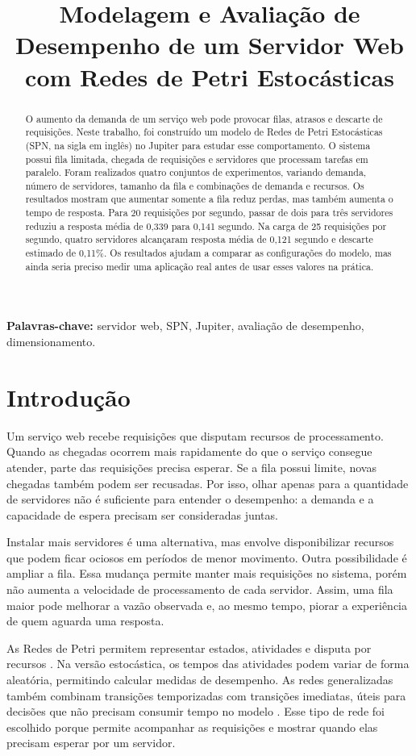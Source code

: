 \documentclass[10pt]{ieeeconf}
\title{Modelagem e Avaliação de Desempenho de um Servidor Web com Redes de Petri Estocásticas}
\begin{document}
\maketitle
\begin{abstract}
O aumento da demanda de um serviço web pode provocar filas, atrasos e descarte de requisições. Neste trabalho, foi construído um modelo de Redes de Petri Estocásticas (SPN, na sigla em inglês) no Jupiter para estudar esse comportamento. O sistema possui fila limitada, chegada de requisições e servidores que processam tarefas em paralelo. Foram realizados quatro conjuntos de experimentos, variando demanda, número de servidores, tamanho da fila e combinações de demanda e recursos. Os resultados mostram que aumentar somente a fila reduz perdas, mas também aumenta o tempo de resposta. Para 20 requisições por segundo, passar de dois para três servidores reduziu a resposta média de 0,339 para 0,141 segundo. Na carga de 25 requisições por segundo, quatro servidores alcançaram resposta média de 0,121 segundo e descarte estimado de 0,11\%. Os resultados ajudam a comparar as configurações do modelo, mas ainda seria preciso medir uma aplicação real antes de usar esses valores na prática.
\end{abstract}
\noindent\textbf{Palavras-chave:} servidor web, SPN, Jupiter, avaliação de desempenho, dimensionamento.

\section{Introdução}
Um serviço web recebe requisições que disputam recursos de processamento. Quando as chegadas ocorrem mais rapidamente do que o serviço consegue atender, parte das requisições precisa esperar. Se a fila possui limite, novas chegadas também podem ser recusadas. Por isso, olhar apenas para a quantidade de servidores não é suficiente para entender o desempenho: a demanda e a capacidade de espera precisam ser consideradas juntas.

Instalar mais servidores é uma alternativa, mas envolve disponibilizar recursos que podem ficar ociosos em períodos de menor movimento. Outra possibilidade é ampliar a fila. Essa mudança permite manter mais requisições no sistema, porém não aumenta a velocidade de processamento de cada servidor. Assim, uma fila maior pode melhorar a vazão observada e, ao mesmo tempo, piorar a experiência de quem aguarda uma resposta.

As Redes de Petri permitem representar estados, atividades e disputa por recursos \cite{murata}. Na versão estocástica, os tempos das atividades podem variar de forma aleatória, permitindo calcular medidas de desempenho. As redes generalizadas também combinam transições temporizadas com transições imediatas, úteis para decisões que não precisam consumir tempo no modelo \cite{marsan}. Esse tipo de rede foi escolhido porque permite acompanhar as requisições e mostrar quando elas precisam esperar por um servidor.
\end{document}
